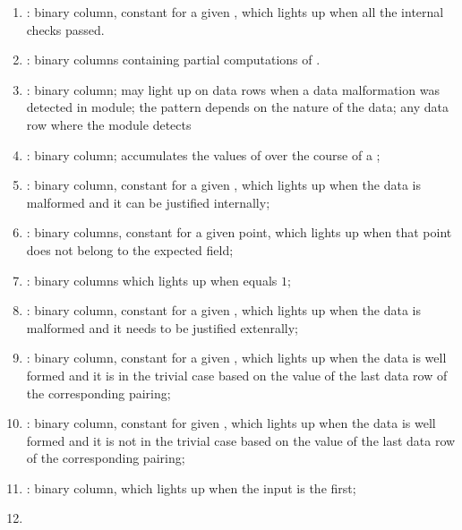 \begin{enumerate}[resume]
    \item
        \both{\internalChecksPassed}:
             binary column, constant for a given \blsId, which lights up when all the internal checks passed.
    \item
        \both{\partialChecks}:
        binary columns containing partial computations of \malformedDataInternalJustification{}.
    \item
        \both{\malformedDataInternalBit}:
        binary column;
        may light up on data rows when a data malformation was detected in module;
        the pattern depends on the nature of the data;
        any data row where the module detects
    \item
        \both{\malformedDataInternalAcc}:
        binary column;
        accumulates the values of \malformedDataInternalBit{} over the course of a \blsId{};
    \item
        \both{\malformedDataInternalJustification}:
        binary column, constant for a given \blsId{},
        which lights up when the data is malformed and it can be justified internally;
    \item
        \both{\malformedDataExternalBit} \blsPrediction{}:
        binary columns, constant for a given point, which lights up when that point does not belong to the expected field; %
    \item
        \both{\malformedDataExternalAcc}:
        binary columns which lights up when \malformedDataExternalBit{} equals $1$;
    \item
        \both{\malformedDataExternalJustification}:
        binary column, constant for a given \blsId, which lights up when the data is malformed and it needs to be justified extenrally;
    \item
        \both{\wellformedDataTrivial}:
        binary column, constant for a given \blsId, which lights up when the data is well formed and it is in the trivial case based on the value of the last data row of the corresponding pairing;
    \item
        \both{\wellformedDataNonTrivial}:
        binary column, constant for  given \blsId, which lights up when the data is well formed and it is not in the trivial case based on the value of the last data row of the corresponding pairing;
    \item
        \isFirstInput:
        binary column, which lights up when the input is the first;
    \item

\end{enumerate}
